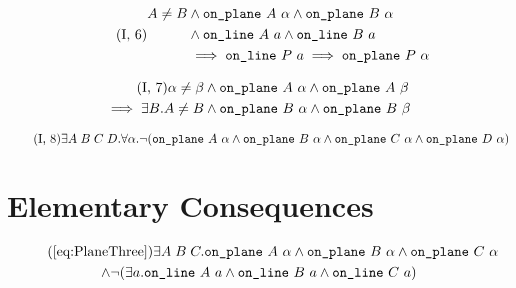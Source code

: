 \begin{equation}\label{eq:g16}
  \tag{I,~6}
  \begin{split}
    A \neq B &\wedge \code{on\_plane}\ A\ \alpha \wedge \code{on\_plane}\ B\ \alpha\\
    &\wedge \code{on\_line}\ A\ a \wedge \code{on\_line}\ B\ a\\
    &\implies \code{on\_line}\ P\ a \implies \code{on\_plane}\ P\ \alpha
  \end{split}
\end{equation}

\begin{multline}
\label{eq:g17}
  \tag{I,~7}
   \alpha \neq \beta \wedge \texttt{on\_plane}\ A\ \alpha \wedge \texttt{on\_plane}\ A\ \beta\\
   \implies \exists B. A \neq B \wedge \texttt{on\_plane}\ B\ \alpha \wedge \texttt{on\_plane}\ B\ \beta
\end{multline}

\begin{equation}
\label{eq:g18}
  \tag{I,~8}
  \exists A\;B\;C\;D. \forall \alpha. \neg(\texttt{on\_plane}\ A\ \alpha \wedge \texttt{on\_plane}\ B\ \alpha \wedge \texttt{on\_plane}\ C\ \alpha \wedge \texttt{on\_plane}\ D\ \alpha)
\end{equation}

\section{Elementary Consequences}
\begin{multline}
  \tag{\ref{eq:PlaneThree}}
  \exists A\;B\;C. \code{on\_plane}\ A\ \alpha\wedge\code{on\_plane}\ B\ \alpha\wedge\code{on\_plane}\ C\ \alpha\\
  \wedge \Triangle{a}{A}{B}{C}
\end{multline}

